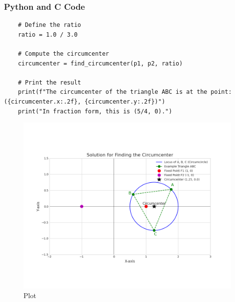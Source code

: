 \documentclass{beamer}
\begin{document}
\begin{frame}[fragile]
\frametitle{Python and C Code}
\begin{lstlisting}
    # Define the ratio
    ratio = 1.0 / 3.0

    # Compute the circumcenter
    circumcenter = find_circumcenter(p1, p2, ratio)

    # Print the result
    print(f"The circumcenter of the triangle ABC is at the point: ({circumcenter.x:.2f}, {circumcenter.y:.2f})")
    print("In fraction form, this is (5/4, 0).")

\end{lstlisting}
\end{frame}
\begin{frame}
\begin{figure}
    \centering
    \includegraphics[width=0.75\columnwidth]{graph9.png}
    \caption{Plot}
    \label{fig:placeholder}
\end{figure}
\end{frame}
\end{document}
